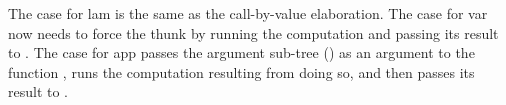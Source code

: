 \begin{code}%
%
\>[6]\AgdaSpace{}%
\AgdaSymbol{:}\AgdaSpace{}%
\AgdaSpace{}%
\AgdaSpace{}%
\<%
\\
%
\>[6]\AgdaSpace{}%
\AgdaSpace{}%
\AgdaSymbol{(}\AgdaSpace{}%
\AgdaOperator{\AgdaInductiveConstructor{,}}\AgdaSpace{}%
\AgdaSpace{}%
\AgdaOperator{\AgdaInductiveConstructor{,}}\AgdaSpace{}%
\AgdaSymbol{)}\AgdaSpace{}%
\AgdaSymbol{=}\AgdaSpace{}%
\AgdaSpace{}%
\AgdaSymbol{(}\AgdaSpace{}%
\AgdaSymbol{)}\<%
\\
%
\>[6]\AgdaSpace{}%
\AgdaSpace{}%
\AgdaSymbol{(}\AgdaSpace{}%
\AgdaSpace{}%
\AgdaOperator{\AgdaInductiveConstructor{,}}\AgdaSpace{}%
\AgdaSpace{}%
\AgdaOperator{\AgdaInductiveConstructor{,}}\AgdaSpace{}%
\AgdaSymbol{\AgdaUnderscore{})}\AgdaSpace{}%
\AgdaSymbol{=}\AgdaSpace{}%
\AgdaSpace{}%
\AgdaSpace{}%
\AgdaSpace{}%
\<%
\\
%
\>[6]\AgdaSpace{}%
\AgdaSpace{}%
\AgdaSymbol{(}\AgdaSpace{}%
\AgdaSpace{}%
\AgdaOperator{\AgdaInductiveConstructor{,}}\AgdaSpace{}%
\AgdaSpace{}%
\AgdaOperator{\AgdaInductiveConstructor{,}}%
\>[32]\AgdaSymbol{)}\AgdaSpace{}%
\AgdaSymbol{=}\AgdaSpace{}%
\AgdaSpace{}%
\AgdaSpace{}%
\AgdaSymbol{(}\AgdaSpace{}%
\AgdaSymbol{(}\AgdaSpace{}%
\AgdaSymbol{))}\AgdaSpace{}%
\AgdaSpace{}%
\<%
\end{code}
\begin{code}[hide]%
%
\>[6]\<%
\\
%
\>[6]\<%
\\
%
\>[6]\<%
\end{code}
%
The case for \ac{lam} is the same as the call-by-value elaboration.
The case for \ac{var} now needs to force the thunk by running the computation and passing its result to .
The case for \ac{app} passes the argument sub-tree () as an argument to the function , runs the computation resulting from doing so, and then passes its result to .
